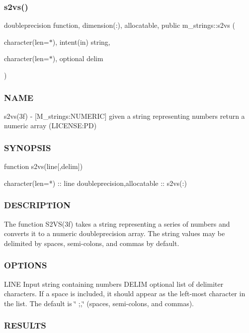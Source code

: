 \subsubsection{\texorpdfstring{s2vs()}{s2vs()}}
{\footnotesize\ttfamily doubleprecision function, dimension(\+:), allocatable, public m\+\_\+strings\+::s2vs (\begin{DoxyParamCaption}\item[{character(len=$\ast$), intent(in)}]{string,  }\item[{character(len=$\ast$), optional}]{delim }\end{DoxyParamCaption})}



\subsubsection*{N\+A\+ME}

s2vs(3f) -\/ \mbox{[}M\+\_\+strings\+:N\+U\+M\+E\+R\+IC\mbox{]} given a string representing numbers return a numeric array (L\+I\+C\+E\+N\+SE\+:PD) 

\subsubsection*{S\+Y\+N\+O\+P\+S\+IS}

\begin{DoxyVerb}   function s2vs(line[,delim])

    character(len=*) :: line
    doubleprecision,allocatable :: s2vs(:)
\end{DoxyVerb}
 \subsubsection*{D\+E\+S\+C\+R\+I\+P\+T\+I\+ON}

\begin{DoxyVerb}The function S2VS(3f) takes a string representing a series of numbers
and converts it to a numeric doubleprecision array. The string values
may be delimited by spaces, semi-colons, and commas by default.
\end{DoxyVerb}


\subsubsection*{O\+P\+T\+I\+O\+NS}

L\+I\+NE Input string containing numbers D\+E\+L\+IM optional list of delimiter characters. If a space is included, it should appear as the left-\/most character in the list. The default is \char`\"{} ;,\char`\"{} (spaces, semi-\/colons, and commas). \subsubsection*{R\+E\+S\+U\+L\+TS}

